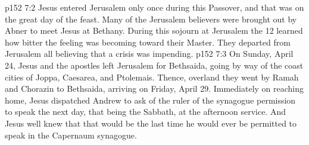 \vs p152 7:2 Jesus entered Jerusalem only once during this Passover, and that was on the great day of the feast. Many of the Jerusalem believers were brought out by Abner to meet Jesus at Bethany. During this sojourn at Jerusalem the 12 learned how bitter the feeling was becoming toward their Master. They departed from Jerusalem all believing that a crisis was impending.
\vs p152 7:3 On Sunday, April 24, Jesus and the apostles left Jerusalem for Bethsaida, going by way of the coast cities of Joppa, Caesarea, and Ptolemais. Thence, overland they went by Ramah and Chorazin to Bethsaida, arriving on Friday, April 29. Immediately on reaching home, Jesus dispatched Andrew to ask of the ruler of the synagogue permission to speak the next day, that being the Sabbath, at the afternoon service. And Jesus well knew that that would be the last time he would ever be permitted to speak in the Capernaum synagogue.
\quizlink
